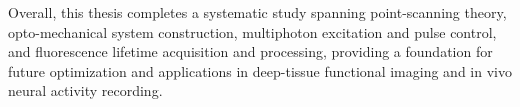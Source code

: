 Overall, this thesis completes a systematic study spanning point-scanning theory, opto-mechanical system construction, multiphoton excitation and pulse control, and fluorescence lifetime acquisition and processing, providing a foundation for future optimization and applications in deep-tissue functional imaging and in vivo neural activity recording.


\cleardoublepage\pagestyle{frontmatterstyle}%

